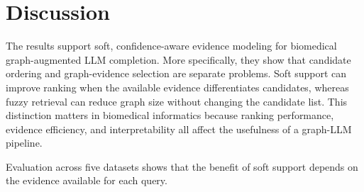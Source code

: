 \documentclass[pdflatex,sn-mathphys-num]{sn-jnl}
\newcommand{\softfuse}{SoftFuse-KGC}
\begin{document}
%


\section{Discussion}
\label{sec:discussion}

The results support soft, confidence-aware evidence modeling for biomedical graph-augmented LLM completion. More specifically, they show that candidate ordering and graph-evidence selection are separate problems. Soft support can improve ranking when the available evidence differentiates candidates, whereas fuzzy retrieval can reduce graph size without changing the candidate list. This distinction matters in biomedical informatics because ranking performance, evidence efficiency, and interpretability all affect the usefulness of a graph-LLM pipeline.


Evaluation across five datasets shows that the benefit of soft support depends on the evidence available for each query. 
\end{document}
